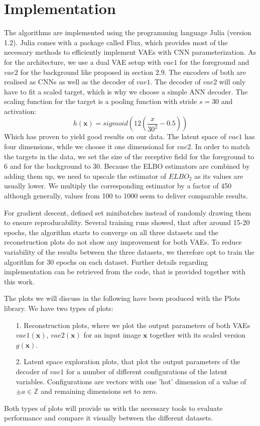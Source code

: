 \documentclass[12pt]{report}
\theoremstyle{definition}
\begin{document}
\section{Implementation}
The algorithms are implemented using the programming language Julia (version 1.2). Julia comes with a package called Flux, which provides most of the necessary methods to efficiently implement VAEs with CNN parameterization.
As for the architecture, we use a dual VAE setup with $vae1$ for the foreground and $vae2$ for the background like proposed in section 2.9. The encoders of both are realised as CNNs as well as the decoder of $vae1$. The decoder of $vae2$ will only have to fit a scaled target, which is why we choose a simple ANN decoder. The scaling function for the target is a pooling function with stride $s=30$ and activation:
\begin{equation}
h(\mathbf{x}) = sigmoid(12(\frac{x}{30^2}-0.5))
\end{equation}
Which has proven to yield good results on our data. The latent space of $vae1$ has four dimensions, while we choose it one dimensional for $vae2$. In order to match the targets in the data, we set the size of the receptive field for the foreground to 6 and for the background to 30. Because the ELBO estimators are combined by adding them up, we need to upscale the estimator of $ELBO_2$ as its values are usually lower. We multiply the corresponding estimator by a factor of 450 although generally, values from 100 to 1000 seem to deliver comparable results.

For gradient descent, defined set minibatches instead of randomly drawing them to ensure reproducability. Several training runs showed, that after around 15-20 epochs, the algorithm starts to converge on all three datasets and the reconstruction plots do not show any improvement for both VAEs. To reduce variability of the results between the three datasets, we therefore opt to train the algorithm for 30 epochs on each dataset.
Further details regarding implementation can be retrieved from the code, that is provided together with this work.

The plots we will discuss in the following have been produced with the Plots library. We have two types of plots:
\begin{itemize}
\item[1.] Reconstruction plots, where we plot the output parameters of both VAEs $vae1(\mathbf{x})$, $vae2(\mathbf{x})$ for an input image $\mathbf{x}$ together with its scaled version $g(\mathbf{x})$.
\item[2.] Latent space exploration plots, that plot the output parameters of the decoder of $vae1$ for a number of different configurations of the latent variables. Configurations are vectors with one 'hot' dimension of a value of $\pm a \in \mathbb{Z}$ and remaining dimensions set to zero.
\end{itemize}
Both types of plots will provide us with the necessary tools to evaluate performance and compare it visually between the different datasets.
\end{document}
